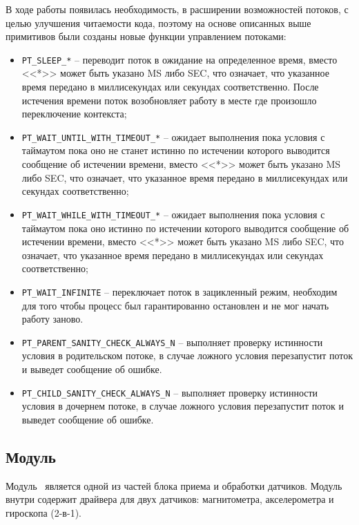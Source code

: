 В ходе работы появилась необходимость, в расширении возможностей потоков, с целью улучшения читаемости кода,
поэтому на основе описанных выше примитивов были созданы новые функции управлением потоками:

\begin{itemize}
    \item \lstinline{PT_SLEEP_*} -- переводит поток в ожидание на определенное время,
    вместо <<*>> может быть указано MS либо SEC, что означает, что указанное время передано в миллисекундах или секундах соответственно.
    После истечения времени поток возобновляет работу в месте где произошло переключение контекста;
    \item \lstinline{PT_WAIT_UNTIL_WITH_TIMEOUT_*} -- ожидает выполнения пока условия с таймаутом пока оно не станет истинно
    по истечении которого выводится сообщение об истечении времени, вместо <<*>> может быть указано MS либо SEC,
    что означает, что указанное время передано в миллисекундах или секундах соответственно;
    \item \lstinline{PT_WAIT_WHILE_WITH_TIMEOUT_*} -- ожидает выполнения пока условия с таймаутом пока оно истинно
    по истечении которого выводится сообщение об истечении времени, вместо <<*>> может быть указано MS либо SEC,
    что означает, что указанное время передано в миллисекундах или секундах соответственно;
    \item \lstinline{PT_WAIT_INFINITE} -- переключает поток в зацикленный режим, необходим для того чтобы процесс был гарантированно остановлен и не мог начать работу заново.
    \item \lstinline{PT_PARENT_SANITY_CHECK_ALWAYS_N} -- выполняет проверку истинности условия в родительском потоке,
    в случае ложного условия перезапустит поток и выведет сообщение об ошибке.
    \item \lstinline{PT_CHILD_SANITY_CHECK_ALWAYS_N} -- выполняет проверку истинности условия в дочернем потоке,
    в случае ложного условия перезапустит поток и выведет сообщение об ошибке.
\end{itemize}


\subsection{Модуль \modulePerifery}
Модуль \modulePerifery\ является одной из частей блока приема и обработки
датчиков. Модуль внутри содержит драйвера для двух датчиков: магнитометра, акселерометра и гироскопа (2-в-1).

